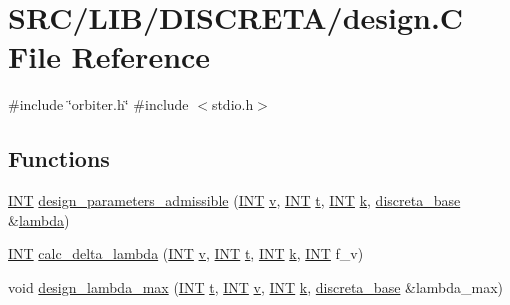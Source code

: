 \hypertarget{_l_i_b_2_d_i_s_c_r_e_t_a_2design_8_c}{}\section{S\+R\+C/\+L\+I\+B/\+D\+I\+S\+C\+R\+E\+T\+A/design.C File Reference}
\label{_l_i_b_2_d_i_s_c_r_e_t_a_2design_8_c}
{\ttfamily \#include \char`\"{}orbiter.\+h\char`\"{}}\newline
{\ttfamily \#include $<$stdio.\+h$>$}\newline
\subsection*{Functions}
\begin{DoxyCompactItemize}
\item 
\mbox{\hyperlink{galois_8h_a09fddde158a3a20bd2dcadb609de11dc}{I\+NT}} \mbox{\hyperlink{_l_i_b_2_d_i_s_c_r_e_t_a_2design_8_c_a1fdc465f664d8b5b87cf6819dd1e6d11}{design\+\_\+parameters\+\_\+admissible}} (\mbox{\hyperlink{galois_8h_a09fddde158a3a20bd2dcadb609de11dc}{I\+NT}} \mbox{\hyperlink{simeon_8_c_aeb3f3030944801b163bc3b829a7f6710}{v}}, \mbox{\hyperlink{galois_8h_a09fddde158a3a20bd2dcadb609de11dc}{I\+NT}} \mbox{\hyperlink{alphabet2_8_c_ac310d9181e916ba43604099aee272c71}{t}}, \mbox{\hyperlink{galois_8h_a09fddde158a3a20bd2dcadb609de11dc}{I\+NT}} \mbox{\hyperlink{simeon_8_c_a43fa990200c3ddd47c35f151bd4d66bf}{k}}, \mbox{\hyperlink{classdiscreta__base}{discreta\+\_\+base}} \&\mbox{\hyperlink{plane__search_8_c_ae2170c3116b1f345ee7505695206555e}{lambda}})
\item 
\mbox{\hyperlink{galois_8h_a09fddde158a3a20bd2dcadb609de11dc}{I\+NT}} \mbox{\hyperlink{_l_i_b_2_d_i_s_c_r_e_t_a_2design_8_c_a6d9006e88fa817dbd9f1f0217983ca75}{calc\+\_\+delta\+\_\+lambda}} (\mbox{\hyperlink{galois_8h_a09fddde158a3a20bd2dcadb609de11dc}{I\+NT}} \mbox{\hyperlink{simeon_8_c_aeb3f3030944801b163bc3b829a7f6710}{v}}, \mbox{\hyperlink{galois_8h_a09fddde158a3a20bd2dcadb609de11dc}{I\+NT}} \mbox{\hyperlink{alphabet2_8_c_ac310d9181e916ba43604099aee272c71}{t}}, \mbox{\hyperlink{galois_8h_a09fddde158a3a20bd2dcadb609de11dc}{I\+NT}} \mbox{\hyperlink{simeon_8_c_a43fa990200c3ddd47c35f151bd4d66bf}{k}}, \mbox{\hyperlink{galois_8h_a09fddde158a3a20bd2dcadb609de11dc}{I\+NT}} f\+\_\+v)
\item 
void \mbox{\hyperlink{_l_i_b_2_d_i_s_c_r_e_t_a_2design_8_c_acdf81c1d4f1b0dbacad39f2c0a1190ed}{design\+\_\+lambda\+\_\+max}} (\mbox{\hyperlink{galois_8h_a09fddde158a3a20bd2dcadb609de11dc}{I\+NT}} \mbox{\hyperlink{alphabet2_8_c_ac310d9181e916ba43604099aee272c71}{t}}, \mbox{\hyperlink{galois_8h_a09fddde158a3a20bd2dcadb609de11dc}{I\+NT}} \mbox{\hyperlink{simeon_8_c_aeb3f3030944801b163bc3b829a7f6710}{v}}, \mbox{\hyperlink{galois_8h_a09fddde158a3a20bd2dcadb609de11dc}{I\+NT}} \mbox{\hyperlink{simeon_8_c_a43fa990200c3ddd47c35f151bd4d66bf}{k}}, \mbox{\hyperlink{classdiscreta__base}{discreta\+\_\+base}} \&lambda\+\_\+max)

\end{DoxyCompactItemize}
